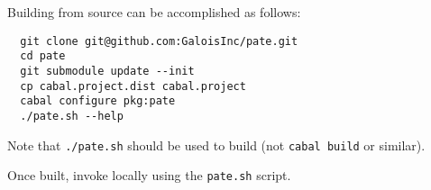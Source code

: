 Building from source can be accomplished as follows:
\begin{verbatim}
  git clone git@github.com:GaloisInc/pate.git
  cd pate
  git submodule update --init
  cp cabal.project.dist cabal.project
  cabal configure pkg:pate
  ./pate.sh --help
\end{verbatim}

Note that \texttt{./pate.sh} should be used to build \pate{} (not \texttt{cabal build} or similar).

Once built, invoke \pate{} locally using the \texttt{pate.sh} script.

